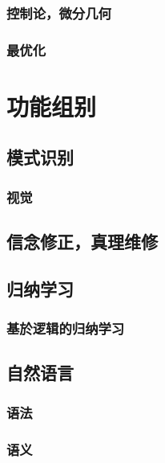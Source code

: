\documentclass[12pt, a4paper]{report}
\newcommand{\cc}[2]{#1}
\newcommand{\cc}[2]{#2}
\theoremstyle{examples} \newtheorem{example}{Example}[section]
\begin{document}
	\section{\cc{控制论，微分几何}{Control theory / differential geometry}}
	
	\section{\cc{最优化}{Optimization}}
	
\part{\cc{功能组别}{Faculties}}

\chapter{\cc{模式识别}{Pattern recognition}}

	\section{\cc{视觉}{Vision}}

\chapter{\cc{信念修正，真理维修}{Belief revision / truth maintenance}}

\chapter{\cc{归纳学习}{Inductive learning}}

	\section{\cc{基於逻辑的归纳学习}{Logic-based inductive learning}}

\chapter{\cc{自然语言}{Natural language}}

	\section{\cc{语法}{Syntax theory}}

	\section{\cc{语义}{Semantic theory}}
\end{document}
